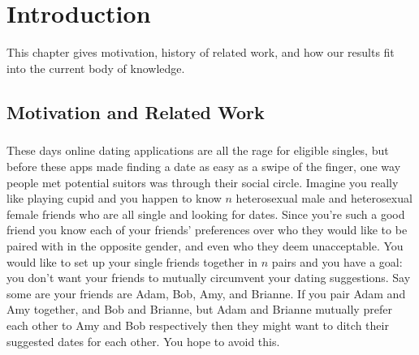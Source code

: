\chapter{Introduction}
This chapter gives motivation, history of related work, and how our results fit into the current body of knowledge.

\section{Motivation and Related Work}\label{sec:related-work}

\paragraph{}
These days online dating applications are all the rage for eligible singles, but before these apps made finding a date as easy as a swipe of the finger, one way people met potential suitors was through their social circle. Imagine you really like playing cupid and you happen to know $n$ heterosexual male and heterosexual female friends who are all single and looking for dates. Since you're such a good friend you know each of your friends' preferences over who they would like to be paired with in the opposite gender, and even who they deem unacceptable. You would like to set up your single friends together in $n$ pairs and you have a goal: you don't want your friends to mutually circumvent your dating suggestions. Say some are your friends are Adam, Bob, Amy, and Brianne. If you pair Adam and Amy together, and Bob and Brianne, but Adam and Brianne mutually prefer each other to Amy and Bob respectively then they might want to ditch their suggested dates for each other. You hope to avoid this.

